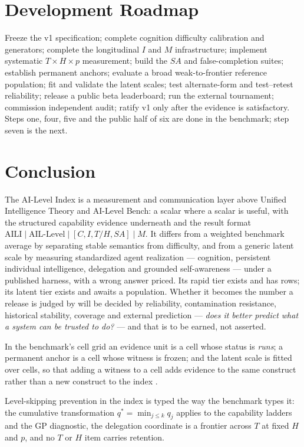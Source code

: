 \documentclass[11pt]{article}
\theoremstyle{definition}
\begin{document}
\section{Development Roadmap}\label{sec:roadmap}

Freeze the v1 specification; complete cognition difficulty calibration and generators; complete the longitudinal $I$ and $M$ infrastructure; implement systematic $T \times H \times p$ measurement; build the $SA$ and false-completion suites; establish permanent anchors; evaluate a broad weak-to-frontier reference population; fit and validate the latent scales; test alternate-form and test--retest reliability; release a public beta leaderboard; run the external tournament; commission independent audit; ratify v1 only after the evidence is satisfactory. Steps one, four, five and the public half of six are done in the benchmark; step seven is the next.

\section{Conclusion}

The AI-Level Index is a measurement and communication layer above Unified Intelligence Theory and AI-Level Bench: a scalar where a scalar is useful, with the structured capability evidence underneath and the result format $\mathrm{AILI} \mid \text{AIL-Level} \mid [C, I, T/H, SA] \mid M$. It differs from a weighted benchmark average by separating stable semantics from difficulty, and from a generic latent scale by measuring standardized agent realization --- cognition, persistent individual intelligence, delegation and grounded self-awareness --- under a published harness, with a wrong answer priced. Its rapid tier exists and has rows; its latent tier exists and awaits a population. Whether it becomes the number a release is judged by will be decided by reliability, contamination resistance, historical stability, coverage and external prediction --- \emph{does it better predict what a system can be trusted to do?} --- and that is to be earned, not asserted.

\appendix
In the benchmark's cell grid an evidence unit is a cell whose status is \emph{runs}; a permanent anchor is a cell whose witness is frozen; and the latent scale is fitted over cells, so that adding a witness to a cell adds evidence to the same construct rather than a new construct to the index \citep{yang2026hilbenchpaper}.

Level-skipping prevention in the index is typed the way the benchmark types it: the cumulative transformation $q^{*} = \min_{j \le k} q_j$ applies to the capability ladders and the GP diagnostic, the delegation coordinate is a frontier across $T$ at fixed $H$ and $p$, and no $T$ or $H$ item carries retention.
\end{document}
